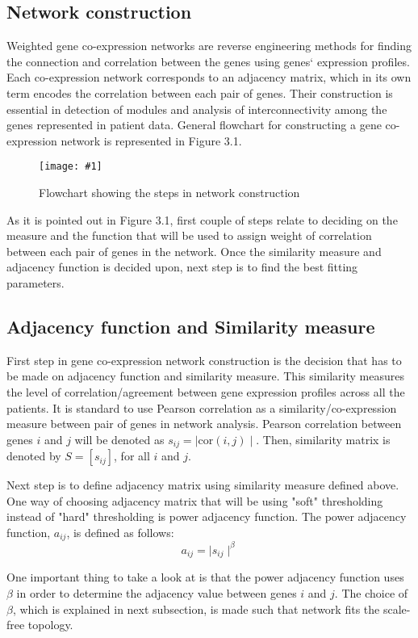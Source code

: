 \documentclass{ba-kecs}
\numberwithin{figure}{section}
\numberwithin{equation}{section}
\newcommand{\dkepicH}[2]{ %
	\begin{figure}[H] %
	\centerline{\texttt{[image: \#1]}}
	\caption{#2}
	\label{#1}
	\end{figure}
}
\begin{document}
\subsection{Network construction}

Weighted gene co-expression networks are reverse engineering methods for finding the connection and correlation between the genes using genes` expression profiles. Each co-expression network corresponds to an adjacency matrix, which in its own term encodes the correlation between each pair of genes. Their construction is essential in detection of modules and analysis of interconnectivity among the genes represented in patient data. General flowchart for constructing a gene co-expression network is represented in Figure 3.1.

\dkepicH{flowchart}{Flowchart showing the steps in network construction}
As it is pointed out in Figure 3.1, first couple of steps relate to deciding on the measure and the function that will be used to assign weight of correlation between each pair of genes in the network. Once the similarity measure and adjacency function is decided upon, next step is to find the best fitting parameters.


\subsection{Adjacency function and Similarity measure}

First step in gene co-expression network construction is the decision that has to be made on adjacency function and similarity measure. This similarity measures the level of correlation/agreement between gene expression profiles across all the patients. It is standard to use Pearson correlation as a similarity/co-expression measure between pair of genes in network analysis. Pearson correlation between genes $i$ and $j$ will be denoted as $s_{ij} = \mid\mathrm{cor}(i,j)\mid $. Then, similarity matrix is denoted by $S = [s_{ij}]$, for all $i$ and $j$.

Next step is to define adjacency matrix using similarity measure defined above. One way of choosing adjacency matrix that will be using "soft" thresholding instead of "hard" thresholding is power adjacency function. The power adjacency function, $a_{ij}$, is defined as follows:
\begin{equation}
a_{ij} = \mid s_{ij} \mid^\beta
\end{equation}

One important thing to take a look at is that the power adjacency function uses $\beta$ in order to determine the adjacency value between genes $i$ and $j$. The choice of $\beta$, which is explained in next subsection, is made such that network fits the scale-free topology.
\end{document}
